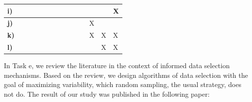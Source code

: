 \documentclass[]{politex-xico}
\begin{document}
\begin{table}[ht]
{\begin{tabular}{l|llll|llll|llll|l|}
\multicolumn{1}{|l|}{\textbf{i)}}         & \multicolumn{1}{l|}{}                  & \multicolumn{1}{l|}{}                  & \multicolumn{1}{l|}{}                  &                   & \multicolumn{1}{l|}{}                  & \multicolumn{1}{l|}{}                  & \multicolumn{1}{l|}{}                  &                   & \multicolumn{1}{l|}{}                 & \multicolumn{1}{l|}{}                 & \multicolumn{1}{l|}{}                  &                   &      \multicolumn{1}{l|}{X}              \\ \hline
\multicolumn{1}{|l|}{\textbf{j)}}         & \multicolumn{1}{l|}{}                  & \multicolumn{1}{l|}{}                  & \multicolumn{1}{l|}{}                  &                   & \multicolumn{1}{l|}{}                  & \multicolumn{1}{l|}{}                  & \multicolumn{1}{l|}{}                  &                   & \multicolumn{1}{l|}{}                  & \multicolumn{1}{l|}{}                  & \multicolumn{1}{l|}{X}                 &                   &                   \\ \hline
\multicolumn{1}{|l|}{\textbf{k)}}         & \multicolumn{1}{l|}{}                  & \multicolumn{1}{l|}{}                  & \multicolumn{1}{l|}{}                  &                   & \multicolumn{1}{l|}{}                  & \multicolumn{1}{l|}{}                  & \multicolumn{1}{l|}{}                  &                   & \multicolumn{1}{l|}{}                  & \multicolumn{1}{l|}{}                  & \multicolumn{1}{l|}{X}                 & X                 & X                 \\ \hline
\multicolumn{1}{|l|}{\textbf{l)}}         & \multicolumn{1}{l|}{}                  & \multicolumn{1}{l|}{}                  & \multicolumn{1}{l|}{}                  &                   & \multicolumn{1}{l|}{}                  & \multicolumn{1}{l|}{}                  & \multicolumn{1}{l|}{}                  &                   & \multicolumn{1}{l|}{}                  & \multicolumn{1}{l|}{}                  & \multicolumn{1}{l|}{}                 & X                 &        X           \\ \hline

\end{tabular}}
\label{Table_schedule}
\end{table}

In Task e, we review the literature in the context of informed data selection mechanisms. Based on the review, we design algorithms of data selection with the goal of maximizing variability, which random sampling, the usual strategy, does not do. The result of our study was published in the following paper:
\end{document}
